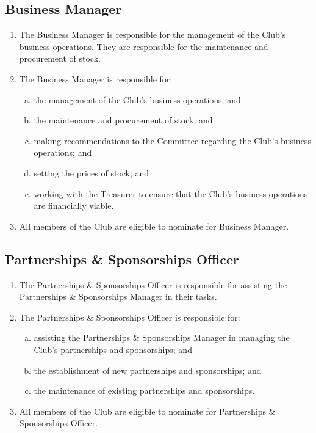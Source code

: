 \documentclass{schedule}
\begin{document}
\subsection{Business Manager}
\begin{enumerate}[(1)]
    \item The Business Manager is responsible for the management of the Club's business operations. They are responsible for the maintenance and procurement of stock.
    \item The Business Manager is responsible for:
          \begin{enumerate}[(a)]
              \item the management of the Club's business operations; and
              \item the maintenance and procurement of stock; and
              \item making recommendations to the Committee regarding the Club's business operations; and
              \item setting the prices of stock; and
              \item working with the Treasurer to ensure that the Club's business operations are financially viable.
          \end{enumerate}
    \item All members of the Club are eligible to nominate for Business Manager.
\end{enumerate}

\subsection{Partnerships \& Sponsorships Officer}
\begin{enumerate}[(1)]
    \item The Partnerships \& Sponsorships Officer is responsible for assisting the Partnerships \& Sponsorships Manager in their tasks.
    \item The Partnerships \& Sponsorships Officer is responsible for:
          \begin{enumerate}[(a)]
              \item assisting the Partnerships \& Sponsorships Manager in managing the Club's partnerships and sponsorships; and
              \item the establishment of new partnerships and sponsorships; and
              \item the maintenance of existing partnerships and sponsorships.
          \end{enumerate}
    \item All members of the Club are eligible to nominate for Partnerships \& Sponsorships Officer.
\end{enumerate}
\end{document}
